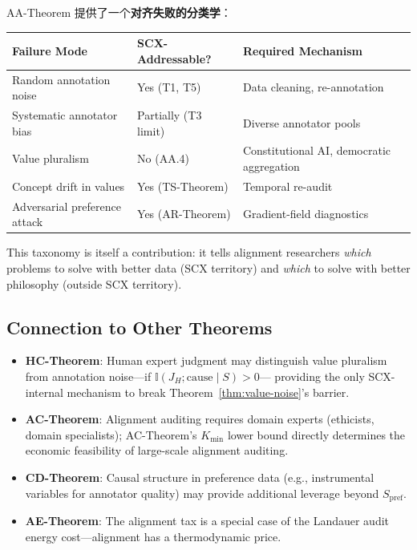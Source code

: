 \documentclass[12pt,a4paper]{article}
\newcommand{\I}{\mathbb{I}}
\begin{document}
AA-Theorem 提供了一个\textbf{对齐失败的分类学}：

\begin{center}
\begin{tabular}{@{}lll@{}}
\toprule
\textbf{Failure Mode} & \textbf{SCX-Addressable?} & \textbf{Required Mechanism} \\
\midrule
Random annotation noise       & Yes (T1, T5)       & Data cleaning, re-annotation \\
Systematic annotator bias     & Partially (T3 limit) & Diverse annotator pools \\
Value pluralism               & No (AA.4)          & Constitutional AI, democratic aggregation \\
Concept drift in values       & Yes (TS-Theorem)   & Temporal re-audit \\
Adversarial preference attack & Yes (AR-Theorem)   & Gradient-field diagnostics \\
\bottomrule
\end{tabular}
\end{center}

This taxonomy is itself a contribution: it tells alignment researchers
\emph{which} problems to solve with better data (SCX territory) and
\emph{which} to solve with better philosophy (outside SCX territory).

\subsection{Connection to Other Theorems}

\begin{itemize}
    \item \textbf{HC-Theorem}: Human expert judgment may distinguish value
          pluralism from annotation noise---if $\I(J_H;\text{cause}\mid S)>0$---
          providing the only SCX-internal mechanism to break
          Theorem~\ref{thm:value-noise}'s barrier.
    \item \textbf{AC-Theorem}: Alignment auditing requires domain experts
          (ethicists, domain specialists); AC-Theorem's $K_{\min}$ lower bound
          directly determines the economic feasibility of large-scale alignment
          auditing.
    \item \textbf{CD-Theorem}: Causal structure in preference data (e.g.,
          instrumental variables for annotator quality) may provide additional
          leverage beyond $S_{\mathrm{pref}}$.
    \item \textbf{AE-Theorem}: The alignment tax is a special case of the
          Landauer audit energy cost---alignment has a thermodynamic price.
\end{itemize}
\end{document}
